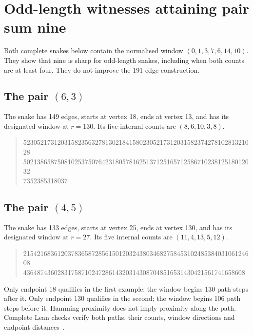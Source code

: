 \documentclass[11pt,a4paper]{article}
\theoremstyle{definition}
\theoremstyle{remark}
\begin{document}
\section{Odd-length witnesses attaining pair sum nine}\label{app:odd-pair-witnesses}
Both complete snakes below contain the normalised window $(0,1,3,7,6,14,10)$.
They show that nine is sharp for odd-length snakes, including when both
counts are at least four. They do not improve the 191-edge construction.

\subsection{The pair $(6,3)$}
The snake has 149 edges, starts at vertex 18, ends at vertex 13, and has its designated window at $r=130$. Its five internal counts are $(8,6,10,3,8)$.

\begin{quote}\ttfamily\small
52305217312031582356327813021841580230521731203158237427810281321028\\
50213865875081025375076423180578162513712516571258671023812518012032\\
7352385318037
\end{quote}

\subsection{The pair $(4,5)$}
The snake has 133 edges, starts at vertex 25, ends at vertex 130, and has its designated window at $r=27$. Its five internal counts are $(11,4,13,5,12)$.

\begin{quote}\ttfamily\small
21542168361203783658728561501203243803468275845310248538403106124608\\
43648743602831758710247286143203143087048516531430421561741658608
\end{quote}

Only endpoint 18 qualifies in the first example; the window begins 130
path steps after it. Only endpoint 130 qualifies in the second; the window
begins 106 path steps before it. Hamming proximity does not imply proximity
along the path. Complete Lean checks verify both paths, their counts, window
directions and endpoint distances~\cite{oddwitnessarchive}.
\end{document}
